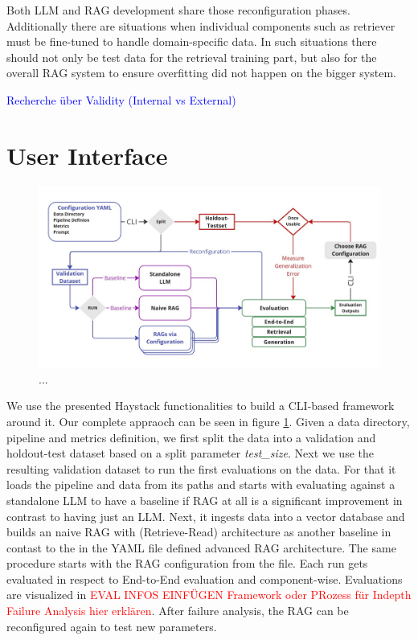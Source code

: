 Both LLM and RAG development share those reconfiguration phases. Additionally there are situations when individual components such as retriever must be fine-tuned to handle domain-specific data. In such situations there should not only be test data for the retrieval training part, but also for the overall RAG system to ensure overfitting did not happen on the bigger system.


\textcolor{blue}{Recherche über Validity (Internal vs External)}



\section{User Interface}

\begin{figure}[!ht]
    \centering
    \includegraphics[width=\textwidth]{images/Sketch.pdf}
    \caption{...}
    \label{fig:EvaluationDesign}
\end{figure}

We use the presented Haystack functionalities to build a CLI-based framework around it. Our complete appraoch can be seen in figure \ref{fig:EvaluationDesign}. Given a data directory, pipeline and metrics definition, we first split the data into a validation and holdout-test dataset based on a split parameter \textit{test\_size}. Next we use the resulting validation dataset to run the first evaluations on the data. For that it loads the pipeline and data from its paths and starts with evaluating against a standalone LLM to have a baseline if RAG at all is a significant improvement in contrast to having just an LLM. Next, it ingests data into a vector database and builds an naive RAG with (Retrieve-Read) architecture as another baseline in contast to the in the YAML file defined advanced RAG architecture. The same procedure starts with the RAG configuration from the file. Each run gets evaluated in respect to End-to-End evaluation and component-wise. Evaluations are visualized in \textcolor{red}{EVAL INFOS EINFÜGEN Framework oder PRozess für Indepth Failure Analysis hier erklären}. After failure analysis, the RAG can be reconfigured again to test new parameters. 

